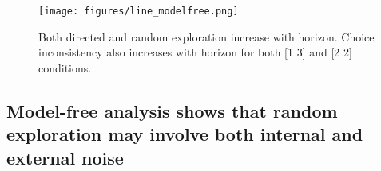 \documentclass[12pt]{article}
\begin{document}
	
	
	
	
	\begin{figure}[H]
		\begin{center}
			\texttt{[image: figures/line\_modelfree.png]}
			\caption{Both directed and random exploration increase with horizon. Choice inconsistency also increases with horizon for both [1 3] and [2 2] conditions.}
			\label{fig:modelfree}
		\end{center}
	\end{figure}
	
	
	\subsection*{Model-free analysis shows that random exploration may involve both internal and external noise}
	
\end{document}
